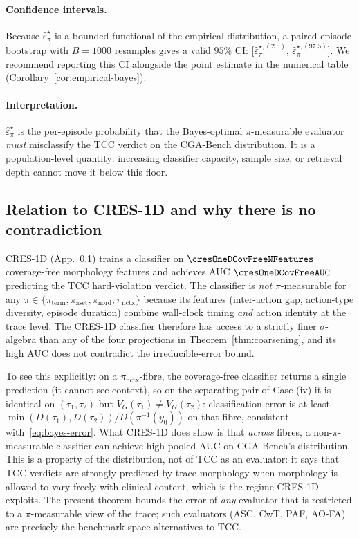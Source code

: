\paragraph{Confidence intervals.}
Because $\widehat{\varepsilon}^{\star}_{\pi}$ is a bounded functional of
the empirical distribution, a paired-episode bootstrap with $B=1000$
resamples gives a valid $95\%$ CI:
$\bigl[\widehat{\varepsilon}^{\star,(2.5)}_{\pi},\,\widehat{\varepsilon}^{\star,(97.5)}_{\pi}\bigr]$.
We recommend reporting this CI alongside the point estimate in the
numerical table (Corollary~\ref{cor:empirical-bayes}).

\paragraph{Interpretation.}
$\widehat{\varepsilon}^{\star}_{\pi}$ is the per-episode probability
that the Bayes-optimal $\pi$-measurable evaluator \emph{must}
misclassify the TCC verdict on the CGA-Bench distribution. It is a
population-level quantity: increasing classifier capacity, sample
size, or retrieval depth cannot move it below this floor.

\subsection{Relation to CRES-1D and why there is no contradiction}
\label{app:thm-cres1d}

CRES-1D (App.~\ref{app:thm-cres1d}) trains a classifier on
$\cresOneDCovFreeNFeatures$ coverage-free morphology features and
achieves AUC $\cresOneDCovFreeAUC$ predicting the TCC hard-violation
verdict. The classifier is \emph{not} $\pi$-measurable for any
$\pi\in\{\pi_{\mathrm{term}},\pi_{\mathrm{aset}},\pi_{\mathrm{nord}},\pi_{\mathrm{nctx}}\}$
because its features (inter-action gap, action-type diversity, episode
duration) combine wall-clock timing \emph{and} action identity at the
trace level. The CRES-1D classifier therefore has access to a
strictly finer $\sigma$-algebra than any of the four projections in
Theorem~\ref{thm:coarsening}, and its high AUC does not contradict the
irreducible-error bound.

To see this explicitly: on a $\pi_{\mathrm{nctx}}$-fibre, the coverage-free
classifier returns a single prediction (it cannot see context), so
on the separating pair of Case (iv) it is identical on
$(\tau_1,\tau_2)$ but $V_G(\tau_1)\neq V_G(\tau_2)$: classification
error is at least $\min(D(\tau_1),D(\tau_2))/D(\pi^{-1}(y_0))$ on that
fibre, consistent with~\eqref{eq:bayes-error}. What CRES-1D does
show is that \emph{across} fibres, a non-$\pi$-measurable classifier
can achieve high pooled AUC on CGA-Bench's distribution. This is a
property of the distribution, not of TCC as an evaluator: it says
that TCC verdicts are strongly predicted by trace morphology when
morphology is allowed to vary freely with clinical content, which is
the regime CRES-1D exploits. The present theorem bounds the error of
\emph{any} evaluator that is restricted to a $\pi$-measurable view of
the trace; such evaluators (ASC, CwT, PAF, AO-FA) are precisely the
benchmark-space alternatives to TCC.
